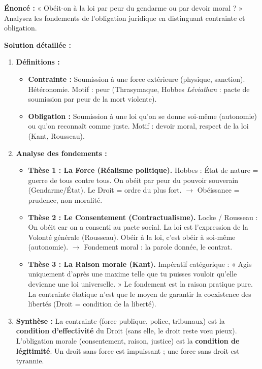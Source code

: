 \documentclass[11pt]{article}
\newcommand{\cle}[1]{{\popxbold\color{popdark}#1}}
\begin{document}
\begin{exoresolu}
\textbf{Énoncé :} « Obéit-on à la loi par peur du gendarme ou par devoir moral ? » Analysez les fondements de l'obligation juridique en distinguant contrainte et obligation.

\tcblower
\textbf{Solution détaillée :}
\begin{enumerate}
    \item \textbf{Définitions :}
    \begin{itemize}
        \item \textbf{Contrainte :} Soumission à une force extérieure (physique, sanction). Hétéronomie. Motif : \cle{peur} (Thrasymaque, Hobbes \textit{Léviathan} : pacte de soumission par peur de la mort violente).
        \item \textbf{Obligation :} Soumission à une loi qu'on se donne soi-même (autonomie) ou qu'on reconnaît comme juste. Motif : \cle{devoir moral}, \cle{respect de la loi} (Kant, Rousseau).
    \end{itemize}
    \item \textbf{Analyse des fondements :}
    \begin{itemize}
        \item \textbf{Thèse 1 : La Force (Réalisme politique).} Hobbes : État de nature = guerre de tous contre tous. On obéit par \cle{peur} du pouvoir souverain (Gendarme/État). Le Droit = ordre du plus fort. $\rightarrow$ Obéissance = prudence, non moralité.
        \item \textbf{Thèse 2 : Le Consentement (Contractualisme).} Locke / Rousseau : On obéit car on a \cle{consenti} au pacte social. La loi est l'expression de la \cle{Volonté générale} (Rousseau). Obéir à la loi, c'est obéir à soi-même (\cle{autonomie}). $\rightarrow$ Fondement moral : la parole donnée, le contrat.
        \item \textbf{Thèse 3 : La Raison morale (Kant).} Impératif catégorique : « Agis uniquement d'après une maxime telle que tu puisses vouloir qu'elle devienne une loi universelle. » Le fondement est la \cle{raison pratique pure}. La contrainte étatique n'est que le moyen de garantir la coexistence des libertés (Droit = condition de la liberté).
    \end{itemize}
    \item \textbf{Synthèse :} La \cle{contrainte} (force publique, police, tribunaux) est la \textbf{condition d'effectivité} du Droit (sans elle, le droit reste vœu pieux). L'\cle{obligation morale} (consentement, raison, justice) est la \textbf{condition de légitimité}. Un droit sans force est impuissant ; une force sans droit est tyrannie.

\end{enumerate}
\end{exoresolu}
\end{document}
